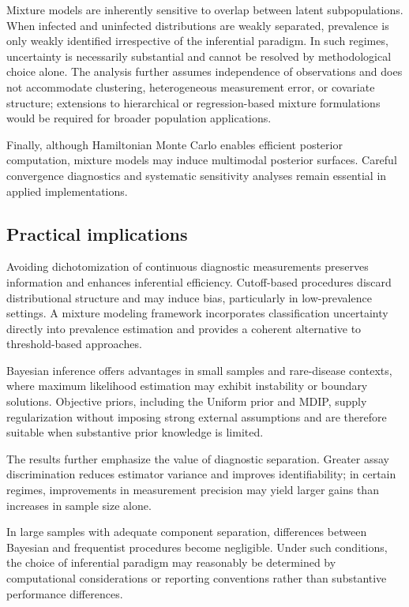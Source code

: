 \documentclass[11pt]{article}
\begin{document}
Mixture models are inherently sensitive to overlap between latent subpopulations. When infected and uninfected distributions are weakly separated, prevalence is only weakly identified irrespective of the inferential paradigm. In such regimes, uncertainty is necessarily substantial and cannot be resolved by methodological choice alone. The analysis further assumes independence of observations and does not accommodate clustering, heterogeneous measurement error, or covariate structure; extensions to hierarchical or regression-based mixture formulations would be required for broader population applications.

Finally, although Hamiltonian Monte Carlo enables efficient posterior computation, mixture models may induce multimodal posterior surfaces. Careful convergence diagnostics and systematic sensitivity analyses remain essential in applied implementations.

\subsection{Practical implications }
Avoiding dichotomization of continuous diagnostic measurements preserves information and enhances inferential efficiency. Cutoff-based procedures discard distributional structure and may induce bias, particularly in low-prevalence settings. A mixture modeling framework incorporates classification uncertainty directly into prevalence estimation and provides a coherent alternative to threshold-based approaches.

Bayesian inference offers advantages in small samples and rare-disease contexts, where maximum likelihood estimation may exhibit instability or boundary solutions. Objective priors, including the Uniform prior and MDIP, supply regularization without imposing strong external assumptions and are therefore suitable when substantive prior knowledge is limited.

The results further emphasize the value of diagnostic separation. Greater assay discrimination reduces estimator variance and improves identifiability; in certain regimes, improvements in measurement precision may yield larger gains than increases in sample size alone.

In large samples with adequate component separation, differences between Bayesian and frequentist procedures become negligible. Under such conditions, the choice of inferential paradigm may reasonably be determined by computational considerations or reporting conventions rather than substantive performance differences.
\end{document}
